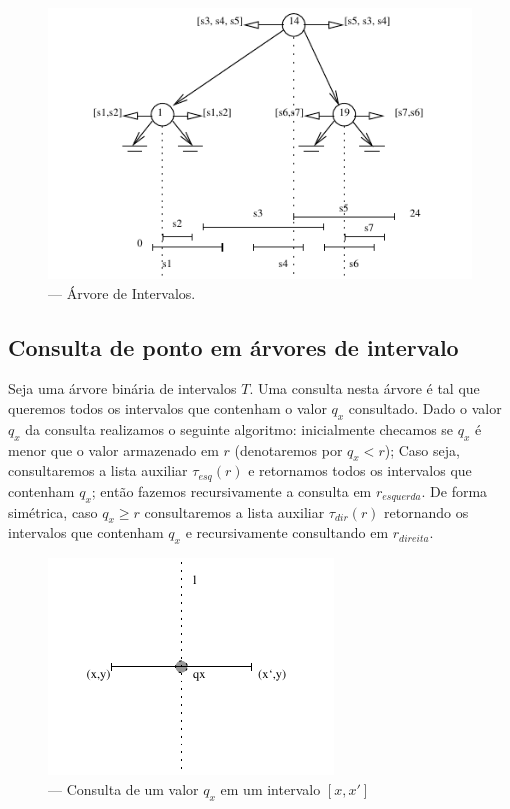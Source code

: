\begin{figure}[h!]
    \begin{center}
        \includegraphics[scale=1.5]{images/interval_tree1.pdf}
    \end{center}
    \caption {— Árvore de Intervalos.}
    \label{fig:19}
\end{figure}

\subsection{Consulta de ponto em árvores de intervalo}
Seja uma árvore binária de intervalos $T$. Uma consulta nesta árvore é tal que queremos todos os intervalos que contenham o valor $q_x$ consultado. Dado o valor $q_x$ da consulta realizamos o seguinte algoritmo: inicialmente checamos se $q_x$ é menor que o valor armazenado em $r$ (denotaremos por $q_x < r$); Caso seja, consultaremos a lista auxiliar $\tau_{esq}(r)$ e retornamos todos os intervalos que contenham $q_x$; então fazemos recursivamente a consulta em $r_{esquerda}$. De forma simétrica, caso $q_x \geq r $  consultaremos a lista auxiliar $\tau_{dir}(r)$ retornando os intervalos que contenham $q_x$ e recursivamente consultando em $r_{direita}$.

\begin{figure}[h!]
    \begin{center}
        \includegraphics[scale=1.5]{images/interval_tree_query.pdf}
    \end{center}
    \caption{ — Consulta de um valor $q_x$ em um intervalo $[x, x']$}
    \label{fig:20}
\end{figure}


